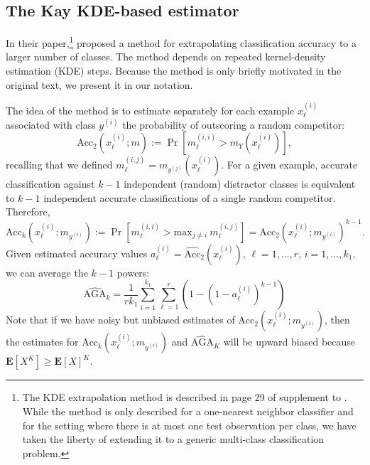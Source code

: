 \documentclass[twoside,11pt]{article}
\newcommand{\E}{\textbf{E}}
\begin{document}
\subsection{The Kay KDE-based estimator}\label{sec:KDEcomparison}

In their paper,\footnote{The KDE extrapolation method is described in page 29 of supplement to \cite{Kay2008a}.  While the method is only described for
a one-nearest neighbor classifier and for the setting where there is at most
one test observation per class, we have taken the liberty of extending it to a generic multi-class classification problem.}
\cite{Kay2008a} proposed a method for extrapolating classification
accuracy to a larger number of classes. The method depends on repeated
kernel-density estimation (KDE) steps. Because the method is only
briefly motivated in the original text, we present it in our
notation.

The idea of the method is to estimate separately for each example $x_\ell^{(i)}$ associated with class $y^{(i)}$ the probability of outscoring a random competitor:
\[\mathrm{Acc}_2 (x_\ell^{(i)}; m) := \Pr[ m_\ell^{(i,i)} > m_Y (x_\ell^{(i)})],\]
recalling that we defined $m_\ell^{(i,j)} = m_{y^{(j)}}(x_\ell^{(i)})$.
For a given example, accurate classification against $k-1$ independent (random) distractor classes
is equivalent to $k-1$ independent accurate classifications of a single random competitor. Therefore,
\[\mathrm{Acc}_k (x_\ell^{(i)} ; m_{y^{(i)}}) := \Pr[ m_\ell^{(i,i)} > \mbox{max}_{j \neq i}\ m_\ell^{(i,j)} ] = \mathrm{Acc}_2(x_\ell^{(i)}; m_{y^{(i)}})^{k-1}. \]
Given estimated accuracy values $a_\ell^{(i)} = \widehat{\mathrm{Acc}}_2 (x_\ell^{(i)})$, $\ell =1,\hdots, r$, $i = 1,...,k_1$,
we can average the $k-1$ powers:
\[\widehat{\mathrm{AGA}}_k  = \frac{1}{rk_1} \sum_{i = 1}^{k_1} \sum_{\ell=1}^r (1-(1-a_\ell^{(i)})^{k-1}) \]
Note that if we have noisy but unbiased estimates of $\mathrm{Acc}_2(x_\ell^{(i)} ; m_{y^{(i)}})$,
then the estimates for $\mathrm{Acc}_k(x_\ell^{(i)} ; m_{y^{(i)}})$ and $\widehat{\mathrm{AGA}}_K$ will be upward biased
because $\E[X^K] \geq \E[X]^K$.
\end{document}
